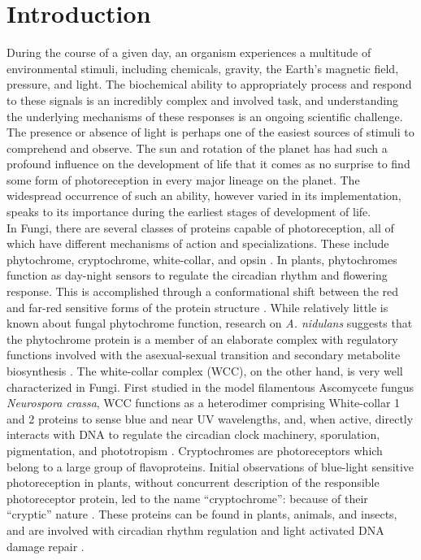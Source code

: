 \section{Introduction}
During the course of a given day, an organism experiences a multitude of environmental stimuli, including chemicals, gravity, the Earth's magnetic field, pressure, and light. The biochemical ability to appropriately process and respond to these signals is an incredibly complex and involved task, and understanding the underlying mechanisms of these responses is an ongoing scientific challenge. \\
\indent The presence or absence of light is perhaps one of the easiest sources of stimuli to comprehend and observe. The sun and rotation of the planet has had such a profound influence on the development of life that it comes as no surprise to find some form of photoreception in every major lineage on the planet. The widespread occurrence of such an ability, however varied in its implementation, speaks to its importance during the earliest stages of development of life. \\
\indent In Fungi, there are several classes of proteins capable of photoreception, all of which have different mechanisms of action and specializations. These include phytochrome, cryptochrome, white-collar, and opsin \cite{Idnurm2010}. In plants, phytochromes function as day-night sensors to regulate the circadian rhythm and flowering response. This is accomplished through a conformational shift between the red and far-red sensitive forms of the protein structure \cite{Rockwell2006}. While relatively little is known about fungal phytochrome function, research on \textit{A. nidulans} suggests that the phytochrome protein is a member of an elaborate complex with regulatory functions involved with the asexual-sexual transition and secondary metabolite biosynthesis \cite{Idnurm2010}. The white-collar complex (WCC), on the other hand, is very well characterized in Fungi. First studied in the model filamentous Ascomycete fungus \textit{Neurospora crassa}, WCC functions as a heterodimer comprising White-collar 1 and 2 proteins to sense blue and near UV wavelengths, and, when active, directly interacts with DNA to regulate the circadian clock machinery, sporulation, pigmentation, and phototropism \cite{Ballario1997,Purschwitz2006,Corrochano2007}. Cryptochromes are photoreceptors which belong to a large group of flavoproteins. Initial observations of blue-light sensitive photoreception in plants, without concurrent description of the responsible photoreceptor protein, led to the name \enquote{cryptochrome}: because of their \enquote{cryptic} nature \cite{Cashmore1999}. These proteins can be found in plants, animals, and insects, and are involved with circadian rhythm regulation and light activated DNA damage repair \cite{Idnurm2010}.\\
